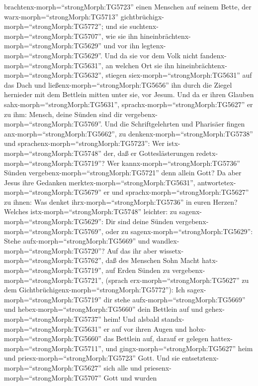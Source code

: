 brachtenx-morph=``strongMorph:TG5723'' einen Menschen auf seinem Bette,
der warx-morph=``strongMorph:TG5713''
gichtbrüchigx-morph=``strongMorph:TG5772''; und sie
suchtenx-morph=``strongMorph:TG5707'', wie sie ihn
hineinbrächtenx-morph=``strongMorph:TG5629'' und vor ihn
legtenx-morph=``strongMorph:TG5629''.  Und da sie vor dem
Volk nicht fandenx-morph=``strongMorph:TG5631'', an welchen Ort sie ihn
hineinbrächtenx-morph=``strongMorph:TG5632'', stiegen
siex-morph=``strongMorph:TG5631'' auf das Dach und
ließenx-morph=``strongMorph:TG5656'' ihn durch die Ziegel hernieder mit
dem Bettlein mitten unter sie, vor Jesum.  Und da er ihren
Glauben sahx-morph=``strongMorph:TG5631'',
sprachx-morph=``strongMorph:TG5627'' er zu ihm: Mensch, deine Sünden
sind dir vergebenx-morph=``strongMorph:TG5769''.  Und die
Schriftgelehrten und Pharisäer fingen anx-morph=``strongMorph:TG5662'',
zu denkenx-morph=``strongMorph:TG5738'' und
sprachenx-morph=``strongMorph:TG5723'': Wer
istx-morph=``strongMorph:TG5748'' der, daß er Gotteslästerungen
redetx-morph=``strongMorph:TG5719''? Wer
kannx-morph=``strongMorph:TG5736'' Sünden
vergebenx-morph=``strongMorph:TG5721'' denn allein Gott? 
Da aber Jesus ihre Gedanken merktex-morph=``strongMorph:TG5631'',
antwortetex-morph=``strongMorph:TG5679'' er und
sprachx-morph=``strongMorph:TG5627'' zu ihnen: Was denket
ihrx-morph=``strongMorph:TG5736'' in euren Herzen?  Welches
istx-morph=``strongMorph:TG5748'' leichter: zu
sagenx-morph=``strongMorph:TG5629'': Dir sind deine Sünden
vergebenx-morph=``strongMorph:TG5769'', oder zu
sagenx-morph=``strongMorph:TG5629'': Stehe
aufx-morph=``strongMorph:TG5669'' und
wandlex-morph=``strongMorph:TG5720''?  Auf das ihr aber
wissetx-morph=``strongMorph:TG5762'', daß des Menschen Sohn Macht
hatx-morph=``strongMorph:TG5719'', auf Erden Sünden zu
vergebenx-morph=``strongMorph:TG5721'', (sprach
erx-morph=``strongMorph:TG5627'' zu dem
Gichtbrüchigenx-morph=``strongMorph:TG5772''): Ich
sagex-morph=``strongMorph:TG5719'' dir stehe
aufx-morph=``strongMorph:TG5669'' und hebex-morph=``strongMorph:TG5660''
dein Bettlein auf und gehex-morph=``strongMorph:TG5737'' heim!
 Und alsbald standx-morph=``strongMorph:TG5631'' er auf vor
ihren Augen und hobx-morph=``strongMorph:TG5660'' das Bettlein auf,
darauf er gelegen hattex-morph=``strongMorph:TG5711'', und
gingx-morph=``strongMorph:TG5627'' heim und
priesx-morph=``strongMorph:TG5723'' Gott.  Und sie
entsetztenx-morph=``strongMorph:TG5627'' sich alle und
priesenx-morph=``strongMorph:TG5707'' Gott und wurden
